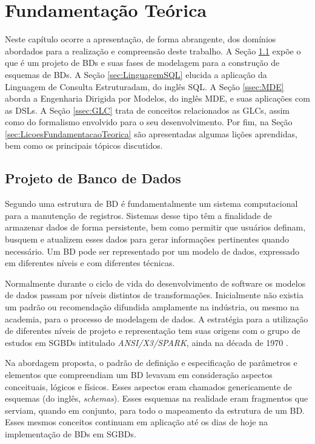 \chapter{Fundamentação Teórica}\label{fundamentacaoTeorica}

Neste capítulo ocorre a apresentação, de forma abrangente, dos domínios abordados para a realização e compreensão deste trabalho. 
A Seção \ref{sec:ProjetoBD} expõe o que é um projeto de \acp{BD} e suas fases de modelagem para a construção de esquemas de \acp{BD}. 
A Seção \ref{sec:LinguagemSQL} elucida a aplicação da Linguagem de Consulta Estruturadam, do inglês \ac{SQL}. 
A Seção \ref{ssec:MDE} aborda a Engenharia Dirigida por Modelos, do inglês \ac{MDE}, e suas aplicações com as \acp{DSL}. 
A Seção \ref{ssec:GLC} trata de conceitos relacionados as \acp{GLC}, assim como do formalismo envolvido para o seu desenvolvimento.
Por fim, na Seção \ref{sec:LicoesFundamentacaoTeorica} são apresentadas algumas lições aprendidas, bem como os principais tópicos discutidos.

\section{Projeto de Banco de Dados} \label{sec:ProjetoBD}

Segundo  uma estrutura de \ac{BD} é fundamentalmente um sistema computacional para a manutenção de registros. 
Sistemas desse tipo têm a finalidade de armazenar dados de forma persistente, bem como permitir que usuários definam, busquem e atualizem esses dados para gerar informações pertinentes quando necessário. 
Um \ac{BD} pode ser representado por um modelo de dados, expressado em diferentes níveis e com diferentes técnicas.

Normalmente durante o ciclo de vida do desenvolvimento de software os modelos de dados passam por níveis distintos de transformações. 
Inicialmente não existia um padrão ou recomendação difundida amplamente na indústria, ou mesmo na academia, para o processo de modelagem de dados. 
A estratégia para a utilização de diferentes níveis de projeto e representação tem suas origens com o grupo de estudos em \acp{SGBD} intitulado \textit{ANSI/X3/SPARK}, ainda na década de 1970 \cite{DBLP:1975}.  

Na abordagem proposta, o padrão de definição e especificação de parâmetros e elementos que compreendiam um \ac{BD} levavam em consideração aspectos conceituais, lógicos e físicos. 
Esses aspectos eram chamados genericamente de esquemas (do inglês, \textit{schemas}). 
Esses esquemas na realidade eram fragmentos que serviam, quando em conjunto, para todo o mapeamento da estrutura de um \ac{BD}. 
Esses mesmos conceitos continuam em aplicação até os dias de hoje na implementação de \acp{BD} em \acp{SGBD}.  

